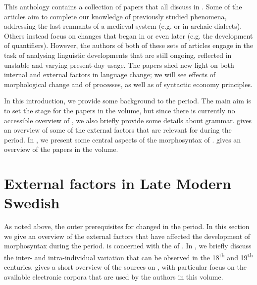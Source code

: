 \documentclass[output=paper]{langscibook}
\begin{document}
This anthology contains a collection of papers that all discuss  in . Some of the articles aim to complete our knowledge of previously studied phenomena, addressing the last remnants of a medieval system (e.g.  or  in archaic dialects). Others instead focus on changes that began in  or even later (e.g. the development of quantifiers). However, the authors of both of these sets of articles engage in the task of analysing linguistic developments that are still ongoing, reflected in unstable and varying present-day usage. The papers shed new light on both internal and external factors in language change; we will see effects of morphological change and of  processes, as well as of syntactic economy principles.



In this introduction, we provide some background to the  period. The main aim is to set the stage for the papers in the volume, but since there is currently no accessible overview of , we also briefly provide some details about  grammar.  gives an overview of some of the external factors that are relevant for  during the period. In , we present some central aspects of the morphosyntax of .  gives an overview of the papers in the volume.


\section{External factors in Late Modern Swedish }\label{sec:intro:2}


As noted above, the outer prerequisites for  changed in the  period. In this section we give an overview of the external factors that have affected the development of  morphosyntax during the period.  is concerned with the  of . In , we briefly discuss the inter- and intra-individual variation that can be observed in the 18\textsuperscript{th} and 19\textsuperscript{th} centuries.  gives a short overview of the sources on , with particular focus on the available electronic corpora that are used by the authors in this volume.
\end{document}
